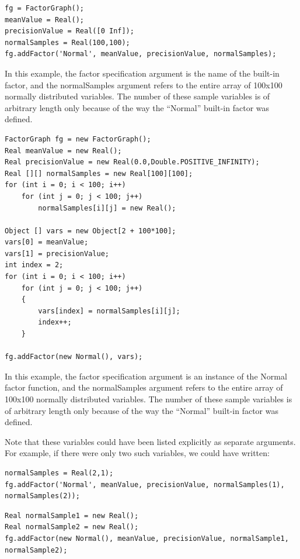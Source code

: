 \ifmatlab

\begin{lstlisting}
fg = FactorGraph();
meanValue = Real();
precisionValue = Real([0 Inf]);
normalSamples = Real(100,100);
fg.addFactor('Normal', meanValue, precisionValue, normalSamples);
\end{lstlisting}


In this example, the factor specification argument is the name of the built-in factor, and the normalSamples argument refers to the entire array of 100x100 normally distributed variables.  The number of these sample variables is of arbitrary length only because of the way the ``Normal'' built-in factor was defined. 

\fi

\ifjava

\begin{lstlisting}
FactorGraph fg = new FactorGraph();
Real meanValue = new Real();
Real precisionValue = new Real(0.0,Double.POSITIVE_INFINITY);
Real [][] normalSamples = new Real[100][100];
for (int i = 0; i < 100; i++)
	for (int j = 0; j < 100; j++)
		normalSamples[i][j] = new Real();
		
Object [] vars = new Object[2 + 100*100];
vars[0] = meanValue;
vars[1] = precisionValue;
int index = 2;
for (int i = 0; i < 100; i++)
	for (int j = 0; j < 100; j++)
	{
		vars[index] = normalSamples[i][j];
		index++;
	}
		
fg.addFactor(new Normal(), vars);
\end{lstlisting}

In this example, the factor specification argument is an instance of the Normal factor function, and the normalSamples argument refers to the entire array of 100x100 normally distributed variables.  The number of these sample variables is of arbitrary length only because of the way the ``Normal'' built-in factor was defined.  

\fi

Note that these variables could have been listed explicitly as separate arguments.  For example, if there were only two such variables, we could have written:

\ifmatlab
\begin{lstlisting}
normalSamples = Real(2,1);
fg.addFactor('Normal', meanValue, precisionValue, normalSamples(1), normalSamples(2));
\end{lstlisting}
\fi

\ifjava
\begin{lstlisting}
Real normalSample1 = new Real();
Real normalSample2 = new Real();
fg.addFactor(new Normal(), meanValue, precisionValue, normalSample1, normalSample2);
\end{lstlisting}
\fi

